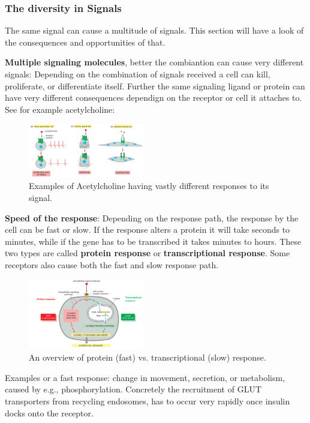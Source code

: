 \documentclass[../main.tex]{subfiles}
\begin{document}
\subsubsection{The diversity in Signals}

The same signal can cause a multitude of signals. This section will have a look of the consequences and opportunities of that. 

\textbf{Multiple signaling molecules}, better the combiantion can cause very different signals: Depending on the combination of signals received a cell can kill, proliferate, or differentiate itself. Further the same signaling ligand or protein can have very different consequences dependign on the receptor or cell it attaches to. See for example acetylcholine: 

\begin{figure}[H]
	\centering
	\includegraphics[width=0.45\textwidth]{Acetylcholine}
	\caption{Examples of Acetylcholine having vastly different responses to its signal.}
\end{figure}

\textbf{Speed of the response}: Depending on the response path, the response by the cell can be fast or slow. If the response alters a protein it will take seconds to minutes, while if the gene has to be transcribed it takes minutes to hours. These two types are called \textbf{protein response} or \textbf{transcriptional response}. Some receptors also cause both the fast and slow response path. 

\begin{figure}[H]
	\centering
	\includegraphics[width=0.45\textwidth]{response_speed}
	\caption{An overview of protein (fast) vs. transcriptional (slow) response.}
\end{figure}

Examples or a fast response: change in movement, secretion, or metabolism, caused by e.g., phosphorylation. Concretely the recruitment of GLUT transporters from recycling endosomes, has to occur very rapidly once insulin docks onto the receptor.
\end{document}
